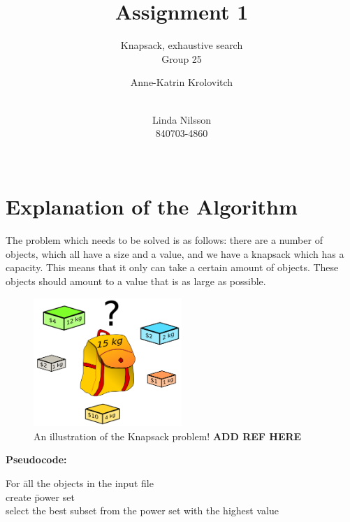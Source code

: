 \documentclass{inc/mas}
\title{Assignment 1}
\subtitle{Knapsack, exhaustive search \\ Group 25}
\affiliation{}
\begin{document}
\author{Anne-Katrin Krolovitch \\ \\ \and
Linda Nilsson \\ 840703-4860 \\ \\ \tabularnewline
}
\maketitle
\section{Explanation of the Algorithm} 
 \noindent The problem which needs to be solved is as follows: there are a number of objects, which all have a size and a value, and we have a knapsack which has a capacity. This means that it only can take a certain amount of objects. These objects should amount to a value that is as large as possible.\\

\begin{figure}[h!]
  \centering
      \includegraphics[width=0.5\textwidth]{Knapsack.png}
  \caption{An illustration of the Knapsack problem! \textbf{ADD REF HERE} }
\end{figure}



\noindent \textbf{Pseudocode:}
\begin{tabbing}
For \= all the objects in the input file \\
\> create \= power set	\\
\> select the best subset from the power set with the highest value\\
\end{tabbing}
\end{document}
